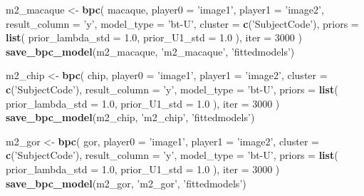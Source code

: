 \documentclass[
]{book}
\newenvironment{Shaded}{\begin{snugshade}}{\end{snugshade}}
\newcommand{\DataTypeTok}[1]{\textcolor[rgb]{0.13,0.29,0.53}{#1}}
\newcommand{\DecValTok}[1]{\textcolor[rgb]{0.00,0.00,0.81}{#1}}
\newcommand{\FloatTok}[1]{\textcolor[rgb]{0.00,0.00,0.81}{#1}}
\newcommand{\KeywordTok}[1]{\textcolor[rgb]{0.13,0.29,0.53}{\textbf{#1}}}
\newcommand{\NormalTok}[1]{#1}
\newcommand{\StringTok}[1]{\textcolor[rgb]{0.31,0.60,0.02}{#1}}
\begin{document}
\begin{Shaded}
\begin{Highlighting}[]
\NormalTok{m2_macaque <-}
\StringTok{  }\KeywordTok{bpc}\NormalTok{(}
\NormalTok{    macaque,}
    \DataTypeTok{player0 =} \StringTok{'image1'}\NormalTok{,}
    \DataTypeTok{player1 =} \StringTok{'image2'}\NormalTok{,}
    \DataTypeTok{result_column =} \StringTok{'y'}\NormalTok{,}
    \DataTypeTok{model_type =} \StringTok{'bt-U'}\NormalTok{,}
    \DataTypeTok{cluster =} \KeywordTok{c}\NormalTok{(}\StringTok{'SubjectCode'}\NormalTok{),}
    \DataTypeTok{priors =} \KeywordTok{list}\NormalTok{(}
      \DataTypeTok{prior_lambda_std =} \FloatTok{1.0}\NormalTok{,}
      \DataTypeTok{prior_U1_std =} \FloatTok{1.0}
\NormalTok{    ),}
    \DataTypeTok{iter =} \DecValTok{3000}
\NormalTok{  )}
\KeywordTok{save_bpc_model}\NormalTok{(m2_macaque, }\StringTok{'m2_macaque'}\NormalTok{, }\StringTok{'fittedmodels'}\NormalTok{)}

\NormalTok{m2_chip <-}
\StringTok{  }\KeywordTok{bpc}\NormalTok{(}
\NormalTok{    chip,}
    \DataTypeTok{player0 =} \StringTok{'image1'}\NormalTok{,}
    \DataTypeTok{player1 =} \StringTok{'image2'}\NormalTok{,}
    \DataTypeTok{cluster =} \KeywordTok{c}\NormalTok{(}\StringTok{'SubjectCode'}\NormalTok{),}
    \DataTypeTok{result_column =} \StringTok{'y'}\NormalTok{,}
    \DataTypeTok{model_type =} \StringTok{'bt-U'}\NormalTok{,}
    \DataTypeTok{priors =} \KeywordTok{list}\NormalTok{(}
      \DataTypeTok{prior_lambda_std =} \FloatTok{1.0}\NormalTok{,}
      \DataTypeTok{prior_U1_std =} \FloatTok{1.0}
\NormalTok{    ),}
    \DataTypeTok{iter =} \DecValTok{3000}
\NormalTok{  )}
\KeywordTok{save_bpc_model}\NormalTok{(m2_chip, }\StringTok{'m2_chip'}\NormalTok{, }\StringTok{'fittedmodels'}\NormalTok{)}

\NormalTok{m2_gor <-}
\StringTok{  }\KeywordTok{bpc}\NormalTok{(}
\NormalTok{    gor,}
    \DataTypeTok{player0 =} \StringTok{'image1'}\NormalTok{,}
    \DataTypeTok{player1 =} \StringTok{'image2'}\NormalTok{,}
    \DataTypeTok{cluster =} \KeywordTok{c}\NormalTok{(}\StringTok{'SubjectCode'}\NormalTok{),}
    \DataTypeTok{result_column =} \StringTok{'y'}\NormalTok{,}
    \DataTypeTok{model_type =} \StringTok{'bt-U'}\NormalTok{,}
    \DataTypeTok{priors =} \KeywordTok{list}\NormalTok{(}
      \DataTypeTok{prior_lambda_std =} \FloatTok{1.0}\NormalTok{,}
      \DataTypeTok{prior_U1_std =} \FloatTok{1.0}
\NormalTok{    ),}
    \DataTypeTok{iter =} \DecValTok{3000}
\NormalTok{  )}
\KeywordTok{save_bpc_model}\NormalTok{(m2_gor, }\StringTok{'m2_gor'}\NormalTok{, }\StringTok{'fittedmodels'}\NormalTok{)}
\end{Highlighting}
\end{Shaded}
\end{document}
